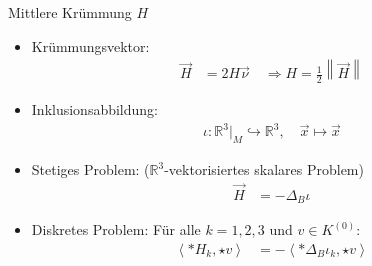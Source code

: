 \documentclass{beamer}
\newcommand{\R}{\mathds{R}}
\begin{document}
  \begin{frame}
    \begin{block}{Mittlere Krümmung \( H \)}
      \begin{itemize}
        \item<1-> Krümmungsvektor: 
          \begin{align*}
            \vec{H} &=2 H \vec{\nu}\quad  \Longrightarrow  H = \frac{1}{2}\left\| \vec{H} \right\|
          \end{align*}
        \item<2-> Inklusionsabbildung: 
            \begin{align*}
                \iota: \R^{3}|_{M} \hookrightarrow \R^{3},\quad \vec{x} \mapsto \vec{x}
            \end{align*}
        \item<3-> Stetiges Problem:  \quad\quad (\( \R^{3} \)-vektorisiertes skalares Problem)
          \begin{align*}
            \vec{H} &= -\Delta_{B}\iota 
          \end{align*}
        \item<4-> Diskretes Problem: Für alle \( k=1,2,3 \) und \( v\in K^{(0)} \):
          \begin{align*}
            \left\langle *H_{k}, \star v \right\rangle &= - \left\langle *\Delta_{B}\iota_{k}, \star v \right\rangle
          \end{align*}
      \end{itemize}
    \end{block}
  \end{frame}
\end{document}
